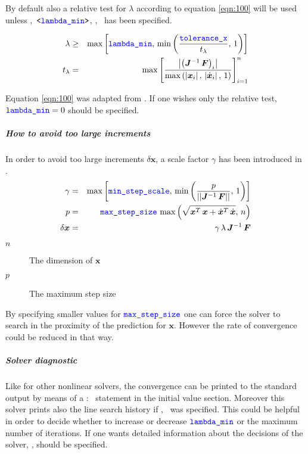 By default also a relative test for $\lambda$ according to equation \ref{eqn:100} will be used unless ,~$\texttt{<\textcolor{blue}{lambda\_min}>}$, ,~ has been specified.

\begin{eqnarray}
\label{eqn:100}
\lambda &\geq& \max{\left[\textcolor{blue}{\texttt{lambda\_min}},\,\min{\left(\frac{\textcolor{blue}{\texttt{tolerance\_x}}}{t_{\lambda}},\,1\right)}\right]} \\ \nonumber
t_{\lambda}&=&\max{\left[\frac{\left|\left(\boldsymbol{J}^{-1}\,\boldsymbol{F}\right)_{i}\right|}{\max{\left(\left|\boldsymbol{x}_i\right|,\, \left|\dot{\boldsymbol{x}}_i\right|,\, 1\right)}}\right]}_{i=1}^{n}
\end{eqnarray}

Equation \ref{eqn:100} was adapted from \cite{NUMERICAL-RECIPES-IN-C}.
If one wishes only the relative test, $\textcolor{blue}{\texttt{lambda\_min}}=0$ should be specified.

\subparagraph{How to avoid too large increments}
In order to avoid too large increments $\delta\boldsymbol{x}$, a scale factor $\gamma$ has been introduced in \cite{NUMERICAL-RECIPES-IN-C}.
\begin{eqnarray}
\gamma &=& \max{\left[\textcolor{blue}{\texttt{min\_step\_scale}}, \, \min{\left(\frac{p}{\left|\left| \boldsymbol{J}^{-1} \, \boldsymbol{F} \right|\right|},\, 1\right)}\right]} \\ \nonumber
p &=& \textcolor{blue}{\texttt{max\_step\_size}} \, \max{\left(\sqrt{\boldsymbol{x}^T\,\boldsymbol{x} + \dot{\boldsymbol{x}}^T\,\dot{\boldsymbol{x}}},\, n\right)} \\ \nonumber
\delta\boldsymbol{x}&=&\gamma\,\lambda\,\boldsymbol{J}^{-1}\,\boldsymbol{F}
\end{eqnarray}

\begin{description}
\item[$n$] The dimension of $\boldsymbol{x}$
\item[$p$] The maximum step size
\end{description}

By specifying smaller values for $\textcolor{blue}{\texttt{max\_step\_size}}$ one can force the solver to search in the proximity of the prediction for $\boldsymbol{x}$. However the rate of convergence could be reduced in that way.

\subparagraph{Solver diagnostic}
Like for other nonlinear solvers, the convergence can be printed to the standard output by means of a :~ statement in the initial value section. Moreover this solver prints also the line search history if ,~ was specified. This could be helpful in order to decide whether to increase or decrease $\textcolor{blue}{\texttt{lambda\_min}}$ or the maximum number of iterations. If one wants detailed information about the decisions of the solver, ,  should be specified.

